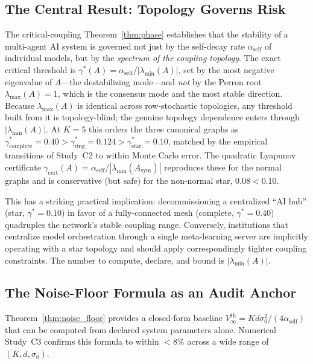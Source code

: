 \documentclass[12pt]{article}
\theoremstyle{plain}
\theoremstyle{definition}
\newcommand{\abs}[1]{\left| #1 \right|}
\begin{document}
\subsection{The Central Result: Topology Governs Risk}

The critical-coupling Theorem~\ref{thm:phase} establishes that the
stability of a multi-agent AI system is governed not just by the
self-decay rate $\alpha_{\mathrm{self}}$ of individual models, but by
the \emph{spectrum of the coupling topology}.  The exact critical threshold
is $\gamma^*(A) = \alpha_{\mathrm{self}}/\abs{\lambda_{\min}(A)}$, set by the
most negative eigenvalue of $A$---the destabilizing mode---and \emph{not} by
the Perron root $\lambda_{\max}(A)=1$, which is the consensus mode and the
most stable direction.  Because $\lambda_{\max}(A)$ is identical across
row-stochastic topologies, any threshold built from it is topology-blind;
the genuine topology dependence enters through $\abs{\lambda_{\min}(A)}$.
At $K=5$ this orders the three canonical graphs as
$\gamma^*_{\mathrm{complete}}=0.40 > \gamma^*_{\mathrm{ring}}=0.124 >
\gamma^*_{\mathrm{star}}=0.10$, matched by the empirical transitions of
Study~C2 to within Monte Carlo error.  The quadratic Lyapunov certificate
$\gamma_{\mathrm{cert}}(A)=\alpha_{\mathrm{self}}/\abs{\lambda_{\min}(A_{\mathrm{sym}})}$
reproduces these for the normal graphs and is conservative (but safe) for
the non-normal star, $0.08<0.10$.

This has a striking practical implication: decommissioning
a centralized ``AI hub'' (star, $\gamma^*=0.10$) in favor of a
fully-connected mesh (complete, $\gamma^*=0.40$) quadruples the network's stable
coupling range.  Conversely, institutions that centralize model
orchestration through a single meta-learning server are implicitly
operating with a star topology and should apply correspondingly tighter
coupling constraints.  The number to compute, declare, and bound is
$\abs{\lambda_{\min}(A)}$.

\subsection{The Noise-Floor Formula as an Audit Anchor}

Theorem~\ref{thm:noise_floor} provides a closed-form baseline
$V_\infty^{\mathrm{th}} = Kd\sigma_0^2/(4\alpha_{\mathrm{self}})$ that
can be computed from declared system parameters alone.  Numerical Study~C3
confirms this formula to within $< 8\%$ across a wide range of $(K, d, \sigma_0)$.
\end{document}
